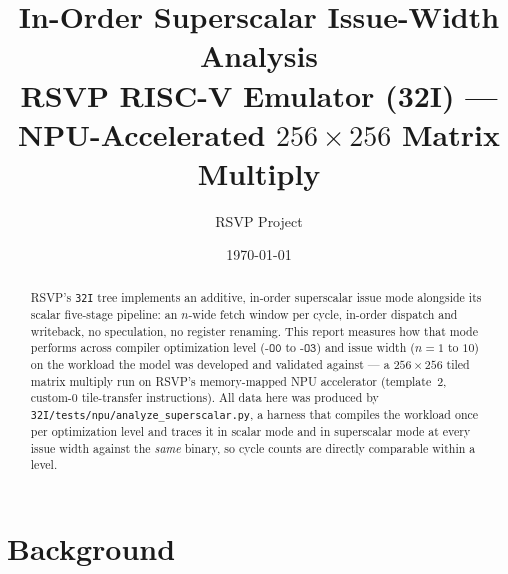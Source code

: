\documentclass[11pt]{article}
\title{\textbf{In-Order Superscalar Issue-Width Analysis} \\[4pt]
\large RSVP RISC-V Emulator (32I) --- NPU-Accelerated $256\times256$ Matrix Multiply}
\author{RSVP Project}
\date{\today}
\begin{document}
\maketitle

\begin{abstract}
\noindent
RSVP's \texttt{32I} tree implements an additive, in-order superscalar issue
mode alongside its scalar five-stage pipeline: an $n$-wide fetch window per
cycle, in-order dispatch and writeback, no speculation, no register renaming.
This report measures how that mode performs across compiler optimization
level ($\texttt{-O0}$ to $\texttt{-O3}$) and issue width ($n=1$ to $10$) on
the workload the model was developed and validated against --- a
$256\times256$ tiled matrix multiply run on RSVP's memory-mapped NPU
accelerator (template~2, custom-0 tile-transfer instructions). All data here
was produced by \texttt{32I/tests/npu/analyze\_superscalar.py}, a harness
that compiles the workload once per optimization level and traces it in
scalar mode and in superscalar mode at every issue width against the
\emph{same} binary, so cycle counts are directly comparable within a level.
\end{abstract}

\tableofcontents

\section{Background}
\end{document}
